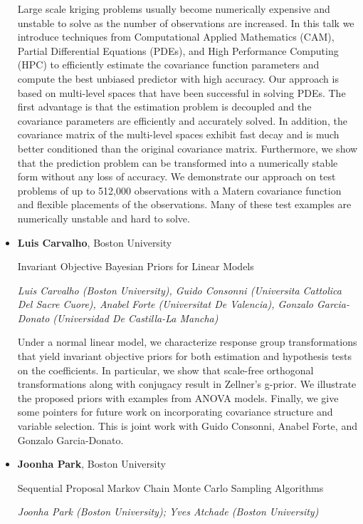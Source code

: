 \begin{itemize}
Large scale kriging problems usually become numerically expensive and unstable to solve as the number of observations are increased. In this talk we introduce techniques from Computational Applied Mathematics (CAM), Partial Differential Equations (PDEs), and High Performance Computing (HPC) to efficiently estimate the covariance function parameters and compute the best unbiased predictor with high accuracy. Our approach is based on multi-level spaces that have been successful in solving PDEs. The first advantage is that the estimation problem is decoupled and the covariance parameters are efficiently and accurately solved. In addition, the covariance matrix of the multi-level spaces exhibit fast decay and is much better conditioned than the original covariance matrix. Furthermore, we show that the prediction problem can be transformed into a numerically stable form without any loss of accuracy. We demonstrate our approach on test problems of up to 512,000 observations with a Matern covariance function and flexible placements of the observations. Many of these test examples are numerically unstable and hard to solve.

\item \textbf{Luis Carvalho}, Boston University

Invariant Objective Bayesian Priors for Linear Models

\emph{\footnotesize Luis Carvalho (Boston University), Guido Consonni (Universita Cattolica Del Sacre Cuore), Anabel Forte (Universitat De Valencia), Gonzalo Garcia-Donato (Universidad De Castilla-La Mancha)}

Under a normal linear model, we characterize response group transformations that yield invariant objective priors for both estimation and hypothesis tests on the coefficients. In particular, we show that scale-free orthogonal transformations along with conjugacy result in Zellner's g-prior. We illustrate the proposed priors with examples from ANOVA models. Finally, we give some pointers for future work on incorporating covariance structure and variable selection. This is joint work with Guido Consonni, Anabel Forte, and Gonzalo Garcia-Donato.

\item \textbf{Joonha Park}, Boston University

Sequential Proposal Markov Chain Monte Carlo Sampling Algorithms

\emph{\footnotesize Joonha Park (Boston University); Yves Atchade (Boston University)}


\end{itemize}
